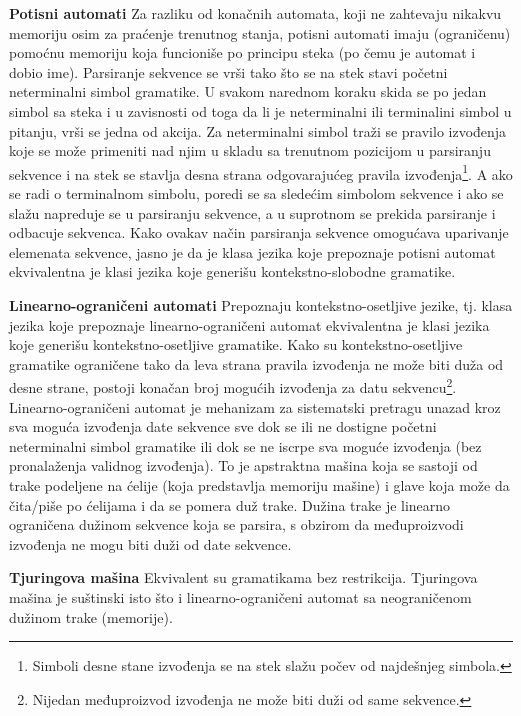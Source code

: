 \documentclass[a4paper, 12pt]{article}
\begin{document}
\vspace*{0.2cm}
\noindent \textbf{Potisni automati} \hspace{0.3cm} Za razliku od konačnih automata, koji ne zahtevaju nikakvu memoriju osim za praćenje trenutnog stanja, potisni automati imaju (ograničenu) pomoćnu memoriju koja funcioniše po principu steka (po čemu je automat i dobio ime). Parsiranje sekvence se vrši tako što se na stek stavi početni neterminalni simbol gramatike. U svakom narednom koraku skida se po jedan simbol sa steka i u zavisnosti od toga da li je neterminalni ili terminalini simbol u pitanju, vrši se jedna od akcija. Za neterminalni simbol traži se pravilo izvođenja koje se može primeniti nad njim u skladu sa trenutnom pozicijom u parsiranju sekvence i na stek se stavlja desna strana odgovarajućeg pravila izvođenja\footnote{Simboli desne stane izvođenja se na stek slažu počev od najdešnjeg simbola.}. A ako se radi o terminalnom simbolu, poredi se sa sledećim simbolom sekvence i ako se slažu napreduje se u parsiranju sekvence, a u suprotnom se prekida parsiranje i odbacuje sekvenca.
Kako ovakav način parsiranja sekvence omogućava uparivanje elemenata sekvence, jasno je da je klasa jezika koje prepoznaje potisni automat ekvivalentna je klasi jezika koje generišu kontekstno-slobodne gramatike.

\vspace*{0.2cm}
\noindent \textbf{Linearno-ograničeni automati} \hspace{0.3cm} Prepoznaju kontekstno-osetljive jezike, tj. klasa jezika koje prepoznaje linearno-ograničeni automat ekvivalentna je klasi jezika koje generišu kontekstno-osetljive gramatike. Kako su kontekstno-osetljive gramatike ograničene tako da leva strana pravila izvođenja ne može biti duža od desne strane, postoji konačan broj mogućih izvođenja za datu sekvencu\footnote{Nijedan međuproizvod izvođenja ne može biti duži od same sekvence.}. Linearno-ograničeni automat je mehanizam za sistematski pretragu unazad kroz sva moguća izvođenja date sekvence sve dok se ili ne dostigne početni neterminalni simbol gramatike ili dok se ne iscrpe sva moguće izvođenja (bez pronalaženja validnog izvođenja). To je apstraktna mašina koja se sastoji od trake podeljene na ćelije (koja predstavlja memoriju mašine) i glave koja može da čita/piše po ćelijama i da se pomera duž trake. Dužina trake je linearno ograničena dužinom sekvence koja se parsira, s obzirom da međuproizvodi izvođenja ne mogu biti duži od date sekvence.

\vspace*{0.2cm}
\noindent \textbf{Tjuringova mašina} \hspace{0.3cm} Ekvivalent su gramatikama bez restrikcija. Tjuringova mašina je suštinski isto što i linearno-ograničeni automat sa neograničenom dužinom trake (memorije).
\end{document}
